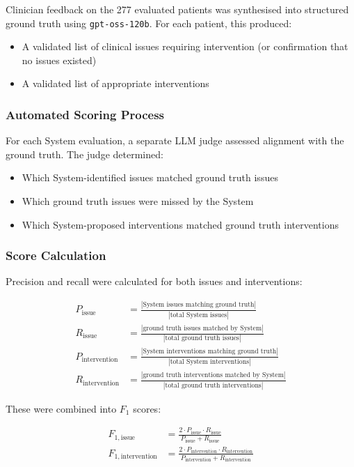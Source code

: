 Clinician feedback on the 277 evaluated patients was synthesised into structured ground truth using \texttt{gpt-oss-120b}. For each patient, this produced:
\begin{itemize}
    \item A validated list of clinical issues requiring intervention (or confirmation that no issues existed)
    \item A validated list of appropriate interventions
\end{itemize}

\subsubsection{Automated Scoring Process}

For each System evaluation, a separate LLM judge assessed alignment with the ground truth. The judge determined:
\begin{itemize}
    \item Which System-identified issues matched ground truth issues
    \item Which ground truth issues were missed by the System
    \item Which System-proposed interventions matched ground truth interventions
\end{itemize}

\subsubsection{Score Calculation}

Precision and recall were calculated for both issues and interventions:

\begin{align}
    P_{\text{issue}} &= \frac{|\text{System issues matching ground truth}|}{|\text{total System issues}|}\\[0.5em]
    R_{\text{issue}} &= \frac{|\text{ground truth issues matched by System}|}{|\text{total ground truth issues}|}\\[0.5em]
    P_{\text{intervention}} &= \frac{|\text{System interventions matching ground truth}|}{|\text{total System interventions}|}\\[0.5em]
    R_{\text{intervention}} &= \frac{|\text{ground truth interventions matched by System}|}{|\text{total ground truth interventions}|}
\end{align}

These were combined into $F_1$ scores:

\begin{align}
    F_{1,\text{issue}} &= \frac{2 \cdot P_{\text{issue}} \cdot R_{\text{issue}}}{P_{\text{issue}} + R_{\text{issue}}}\\[0.5em]
    F_{1,\text{intervention}} &= \frac{2 \cdot P_{\text{intervention}} \cdot R_{\text{intervention}}}{P_{\text{intervention}} + R_{\text{intervention}}}
\end{align}

